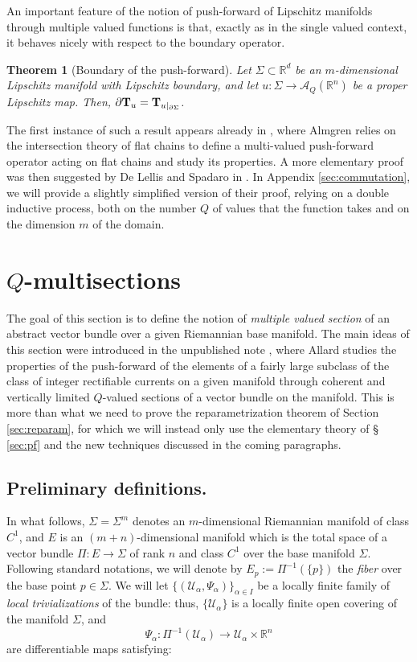 \documentclass[a4paper,11pt,reqno]{amsart}
\newtheorem{theorem}{Theorem}[section]
\theoremstyle{definition}
\numberwithin{equation}{section}
\numberwithin{subsection}{section}
\newcommand{\R}{\mathbb{R}}
\newcommand{\U}{\mathcal{U}}
\newcommand{\A}{\mathcal{A}}
\begin{document}
An important feature of the notion of push-forward of Lipschitz manifolds through multiple valued functions is that, exactly as in the single valued context, it behaves nicely with respect to the boundary operator.

\begin{theorem}[Boundary of the push-forward] \label{pf_bdry:thm}
Let $\Sigma \subset \R^{d}$ be an $m$-dimensional Lipschitz manifold with Lipschitz boundary, and let $u \colon \Sigma \to \A_{Q}(\R^{n})$ be a proper Lipschitz map. Then, $\partial {\bf T}_{u} = {\bf T}_{u|_{\partial \Sigma}}$. 
\end{theorem}

The first instance of such a result appears already in \cite[Section 1.6]{Almgren00}, where Almgren relies on the intersection theory of flat chains to define a multi-valued push-forward operator acting on flat chains and study its properties. A more elementary proof was then suggested by De Lellis and Spadaro in \cite[Theorem 2.1]{DLS13a}. In Appendix \ref{sec:commutation}, we will provide a slightly simplified version of their proof, relying on a double inductive process, both on the number $Q$ of values that the function takes and on the dimension $m$ of the domain.

\section{$Q$-multisections} \label{sec:sections}

The goal of this section is to define the notion of \emph{multiple valued section} of an abstract vector bundle over a given Riemannian base manifold. The main ideas of this section were introduced in the unpublished note \cite{Allard}, where Allard studies the properties of the push-forward of the elements of a fairly large subclass of the class of integer rectifiable currents on a given manifold through coherent and vertically limited $Q$-valued sections of a vector bundle on the manifold. This is more than what we need to prove the reparametrization theorem of Section \ref{sec:reparam}, for which we will instead only use the elementary theory of \S\, \ref{sec:pf} and the new techniques discussed in the coming paragraphs.

\subsection{Preliminary definitions.} In what follows, $\Sigma = \Sigma^{m}$ denotes an $m$-dimensional Riemannian manifold of class $C^{1}$, and $E$ is an $(m+n)$-dimensional manifold which is the total space of a vector bundle $\Pi \colon E \to \Sigma$ of rank $n$ and class $C^{1}$ over the base manifold $\Sigma$. Following standard notations, we will denote by $E_{p} := \Pi^{-1}(\{p\})$ the \emph{fiber} over the base point $p \in \Sigma$. We will let $\{(\U_{\alpha}, \Psi_{\alpha})\}_{\alpha \in I}$ be a locally finite family of \emph{local trivializations} of the bundle: thus, $\{\U_{\alpha}\}$ is a locally finite open covering of the manifold $\Sigma$, and 
\[
\Psi_{\alpha} \colon \Pi^{-1}(\U_{\alpha}) \to \U_{\alpha} \times \R^{n}
\]
are differentiable maps satisfying:
\end{document}
